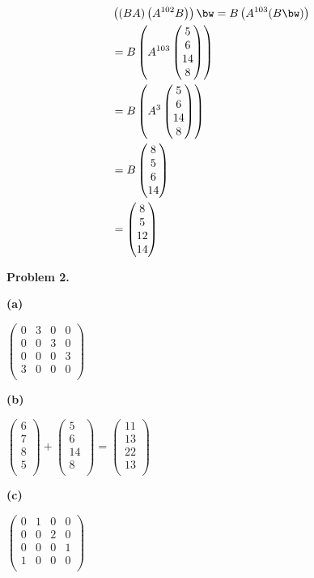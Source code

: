\documentclass[oneside,12pt]{amsart}
\begin{document}
\begin{align*}
&\left((BA) \left(A^{102}  B\right) \right ) \bw = B \left (A^{103} (B \bw) \right) \\
&= B \left( A^{103}
\begin{pmatrix}
5 \\
6 \\
14 \\
8 \\
\end{pmatrix}
\right) \\
&= B \left( A^{3}
\begin{pmatrix}
5 \\
6 \\
14 \\
8 \\
\end{pmatrix}
\right) \\
&= B
\begin{pmatrix}
8 \\
5 \\
6 \\
14
\end{pmatrix} \\
&=
\begin{pmatrix}
8 \\
5 \\
12 \\
14
\end{pmatrix}
\end{align*}

\textbf{Problem 2.}

\textbf{(a)}

\smallskip
$
\begin{pmatrix}
0 & 3 & 0 & 0\\
0 & 0 & 3 & 0\\
0 & 0 & 0 & 3\\
3 & 0 & 0 & 0\\
\end{pmatrix}
$

\smallskip

\textbf{(b)}
\smallskip

$
\begin{pmatrix}
6 \\
7 \\
8 \\
5 \\
\end{pmatrix}
+
\begin{pmatrix}
5 \\
6 \\
14 \\
8\\
\end{pmatrix}
=
\begin{pmatrix}
11 \\
13 \\
22 \\
13 \\
\end{pmatrix}
$

\smallskip

\textbf{(c)}

\smallskip

$
\begin{pmatrix}
0 & 1 & 0 & 0\\
0 & 0 & 2 & 0\\
0 & 0 & 0 & 1\\
1 & 0 & 0 & 0\\
\end{pmatrix}
$
\end{document}
